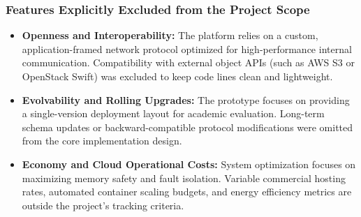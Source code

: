 \subsubsection{Features Explicitly Excluded from the Project Scope}
\begin{itemize}
    \item \textbf{Openness and Interoperability:} The platform relies on a custom, application-framed network protocol optimized for high-performance internal communication. Compatibility with external object APIs (such as AWS S3 or OpenStack Swift) was excluded to keep code lines clean and lightweight.
    \item \textbf{Evolvability and Rolling Upgrades:} The prototype focuses on providing a single-version deployment layout for academic evaluation. Long-term schema updates or backward-compatible protocol modifications were omitted from the core implementation design.
    \item \textbf{Economy and Cloud Operational Costs:} System optimization focuses on maximizing memory safety and fault isolation. Variable commercial hosting rates, automated container scaling budgets, and energy efficiency metrics are outside the project's tracking criteria.
\end{itemize}